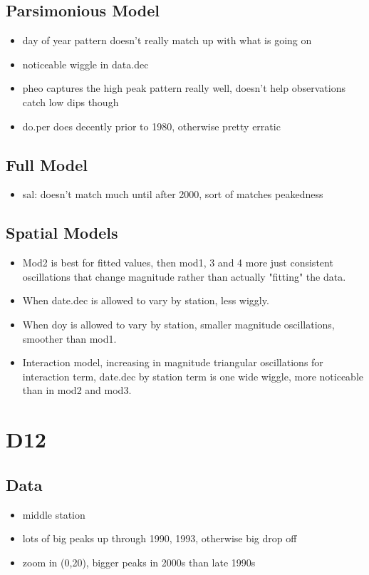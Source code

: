 \documentclass[12pt]{amsart}
\begin{document}
\subsection{Parsimonious Model}
\begin{itemize}
\item day of year pattern doesn't really match up with what is going on
\item noticeable wiggle in data.dec
\item pheo captures the high peak pattern really well, doesn't help observations catch low dips though
\item do.per does decently prior to 1980, otherwise pretty erratic
\end{itemize}
\subsection{Full Model}
\begin{itemize}
\item sal: doesn't match much until after 2000, sort of matches peakedness
\end{itemize}

\subsection{Spatial Models}

\begin{itemize}
\item Mod2 is best for fitted values, then mod1, 3 and 4 more just consistent oscillations that change magnitude rather than actually "fitting" the data.
\item When date.dec is allowed to vary by station, less wiggly.
\item When doy is allowed to vary by station, smaller magnitude oscillations, smoother than mod1. 
\item Interaction model, increasing in magnitude triangular oscillations for interaction term, date.dec by station term is one wide wiggle, more noticeable than in mod2 and mod3.
\end{itemize}


\section{D12}
\subsection{Data}
\begin{itemize}
\item middle station
\item lots of big peaks up through 1990, 1993, otherwise big drop off
\item zoom in (0,20), bigger peaks in 2000s than late 1990s
\end{itemize}
\end{document}
